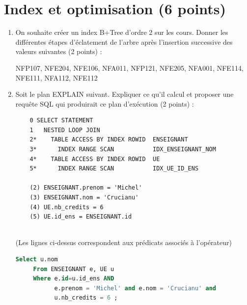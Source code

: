  
\section{Index et optimisation  (6 points)}

\begin{enumerate}
  \item On souhaite cr\'eer un index B+Tree d'ordre 2 sur les cours. Donner les diff\'erentes \'etapes d'\'eclatement de l'arbre apr\`es l'insertion successive des valeurs suivantes (2 points) :
  \begin{center}
  NFP107, NFE204, NFE106, NFA011, NFP121, NFE205, NFA001, NFE114, NFE111, NFA112, NFE112
  \end{center}
\begin{correction}
  \begin{figure}[htbp]
  \centering
  \end{figure}
\end{correction}

 	\item Soit le plan EXPLAIN suivant. Expliquer ce qu'il calcul et proposer une requ\^ete SQL qui produirait ce plan d'ex\'ecution (2 points) :
    ~
    \begin{verbatim}
    0 SELECT STATEMENT
    1   NESTED LOOP JOIN
    2*    TABLE ACCESS BY INDEX ROWID  ENSEIGNANT
    3*      INDEX RANGE SCAN           IDX_ENSEIGNANT_NOM
    4*    TABLE ACCESS BY INDEX ROWID  UE
    5*      INDEX RANGE SCAN           IDX_UE_ID_ENS

    (2) ENSEIGNANT.prenom = 'Michel'
    (3) ENSEIGNANT.nom = 'Crucianu'
    (4) UE.nb_credits = 6
    (5) UE.id_ens = ENSEIGNANT.id
    
    \end{verbatim}
    (Les lignes ci-dessus correspondent aux pr\'edicats associ\'es \`a l'op\'erateur)
    \begin{correction}\begin{lstlisting}[language=SQL]
     Select u.nom
     From ENSEIGNANT e, UE u
     Where e.id=u.id_ens AND
           e.prenom = 'Michel' and e.nom = 'Crucianu' and
           u.nb_credits = 6 ;
     \end{lstlisting}
\end{correction}
 

\end{enumerate}
